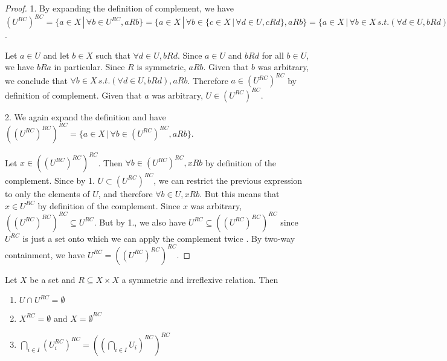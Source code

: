 \begin{proof}
	1. By expanding the definition of complement, we have $(U^{RC})^{RC}=\{ a \in X \, | \, \forall b \in U^{RC}, aRb \} = \{ a \in X \, | \, \forall b \in \{ c \in X \, | \, \forall d \in U, cRd  \}, aRb \} = \{ a \in X \, | \, \forall b \in X \, s.t. (\forall d \in U, bRd), aRb \}$.
	
	Let $a \in U$ and let $b \in X$ such that $\forall d \in U, bRd$. Since $a \in U$ and $bRd$ for all $b \in U$, we have $bRa$ in particular. Since $R$ is symmetric, $aRb$. Given that $b$ was arbitrary, we conclude that $\forall b \in X \, s.t. (\forall d \in U, bRd), aRb$. Therefore $a \in (U^{RC})^{RC}$ by definition of complement. Given that $a$ was arbitrary, $U \in (U^{RC})^{RC}$.
	
	2. We again expand the definition and have $((U^{RC})^{RC})^{RC} = \{ a \in X \, | \, \forall b \in (U^{RC})^{RC}, aRb \}$.
	
	Let $x \in ((U^{RC})^{RC})^{RC}$. Then $\forall b \in (U^{RC})^{RC}, xRb$ by definition of the complement. Since by 1. $U \subset (U^{RC})^{RC}$, we can restrict the previous expression to only the elements of $U$, and therefore $\forall b \in U, xRb$. But this means that $x \in U^{RC}$ by definition of the complement. Since $x$ was arbitrary, $((U^{RC})^{RC})^{RC} \subseteq U^{RC}$. But by 1., we also have $U^{RC} \subseteq ((U^{RC})^{RC})^{RC}$ since $U^{RC}$ is just a set onto which we can apply the complement twice . By two-way containment, we have $U^{RC} = ((U^{RC})^{RC})^{RC}$.
\end{proof}

\begin{conj}\label{pm_ensmblespaces_symirreflproperties}
	Let $X$ be a set and $R \subseteq X \times X$ a symmetric and irreflexive relation. Then
	\begin{enumerate}
	\item $U \cap U^{RC} = \emptyset$
	\item $X^{RC} = \emptyset$ and $X = \emptyset^{RC}$
	\item $\bigcap_{i \in I} (U_i^{RC})^{RC} = ((\bigcap_{i \in I} U_i)^{RC})^{RC}$
\end{enumerate}
\end{conj}

